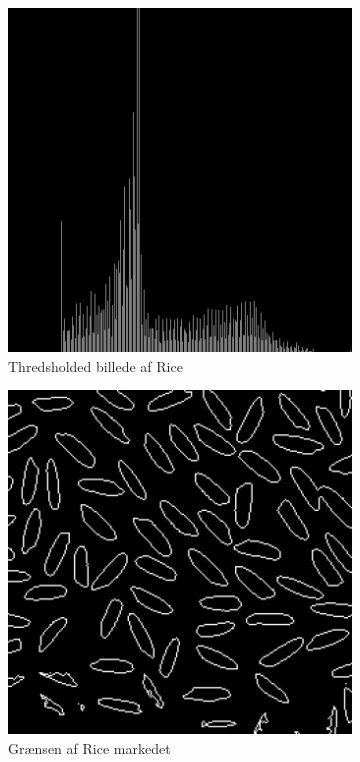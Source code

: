 \documentclass{article}
\begin{document}
\begin{figure}[!h]
	\begin{subfigure}[b]{0.49\linewidth}
		\includegraphics[width=\linewidth]{histogram.png}
		\caption{Thredsholded billede af Rice}
		\label{fig:f3}
	\end{subfigure}
	\hfill
	\begin{subfigure}[b]{0.49\linewidth}
		\includegraphics[width=\linewidth]{cornOutlined.png}
		\caption{Grænsen af Rice markedet}
		\label{fig:f4}
	\end{subfigure}
	\caption{}
	\label{fig:image2}
\end{figure}
\end{document}
